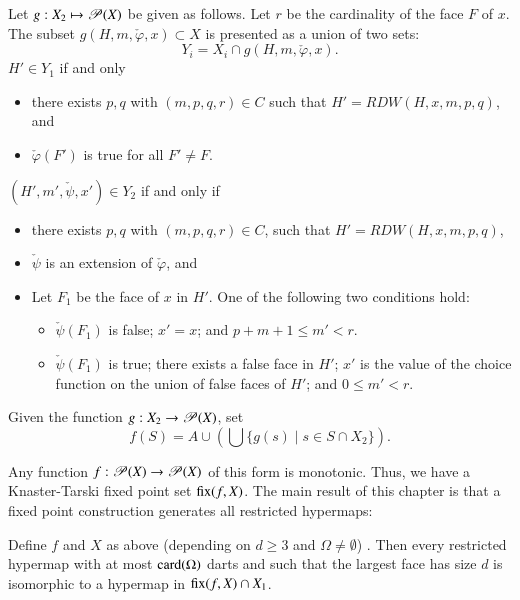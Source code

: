 \begin{definition}[g]
 Let $g:X_2 \mapsto {\mathscr P}(X)$ be given as
  follows.  Let $r$ be the cardinality of the face $F$ of $x$.  The
  subset $g(H,m,\check\varphi,x)\subset X$ is presented as a union of two
  sets:
\begin{displaymath}
   Y_i = X_i \cap g(H,m,\check\varphi,x).
\end{displaymath}
 $H'\in Y_1$ if and only 
\begin{itemize}
\item there exists
$p,q$ with $(m,p,q,r)\in C$ such that $H'=RDW(H,x,m,p,q)$,
and 
\item $\check\varphi(F')$ is true for all $F'\ne F$.
\end{itemize}
 $(H',m',\check\psi,x')\in Y_2$ if and only if
\begin{itemize}
\item there exists $p,q$ with $(m,p,q,r)\in C$, such that $H'=RDW(H,x,m,p,q)$,
\item  $\check\psi$ is an extension of
$\check\varphi$, and 
\item Let $F_1$ be the face of $x$ in $H'$.  One of the following two
  conditions hold:
\begin{itemize}
\item $\check\psi(F_1)$ is false;  $x' = x$; and  $p+m+1 \le m' < r$.
\item $\check\psi(F_1)$ is true; there exists a false face in $H'$; $x'$ is
  the value of the choice function on the union of false faces of
  $H'$; and $0 \le m' < r$.
\end{itemize}
\end{itemize}
\end{definition}


\begin{definition}[f]
Given the function 
$g:X_2 \to {\mathscr P}(X)$, set 
\begin{displaymath}f(S) = A \cup (\bigcup \{g(s) \mid s\in S\cap
X_2\}).\end{displaymath}
%
\end{definition}

Any function $f :{\mathscr P}(X)\to {\mathscr P}(X)$ of this form is
monotonic.  Thus, we have a Knaster-Tarski fixed point set
${\operatorname{fix}}(f,X)$.  The main result of this chapter is that a fixed
point construction generates all restricted hypermaps:

\begin{theorem}  
\label{lemma:algorithm}
Define $f $ and $X$ as above (depending on $d\ge 3$ and $\Omega\ne
\emptyset$) .    Then every restricted hypermap with at
most ${\operatorname{card}}(\Omega)$ darts and such that the largest face has size  $d$
is isomorphic to a hypermap in ${\operatorname{fix}}(f,X)\cap X_1$.
\end{theorem}


